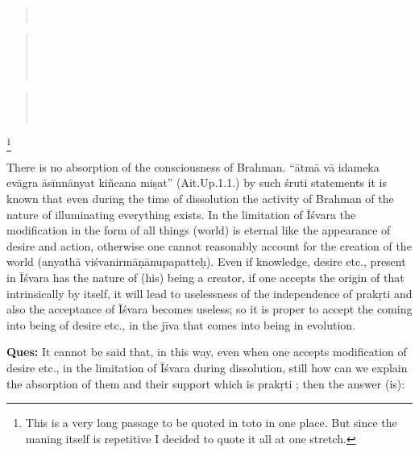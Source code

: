 \begin{verse}
\\
\end{verse}
\begin{verse}
\\
\\
\\
\end{verse}
\begin{verse}
\\
\\
\end{verse}
\footnote{This is a very long passage to be quoted in toto in one place. But since the maning itself is repetitive I decided to quote it all at one stretch.}

There is no absorption of the consciousness of Brahman. “ātmā vā idameka evāgra āsīnnānyat kiñcana miṣat” (Ait.Up.1.1.) by such śruti statements it is known that even during the time of dissolution the activity of Brahman of the nature of illuminating everything exists. In the limitation of Īśvara the modification in the form of all things (world) is eternal like the appearance of desire and action, otherwise one cannot reasonably account for the creation of the world (anyathā viśvanirmāṇānupapatteḥ). Even if knowledge, desire etc., present in Īśvara has the nature of (his) being a creator, if one accepts the origin of that intrinsically by itself, it will lead to uselessness of the independence of prakṛti and also the acceptance of Īśvara becomes useless; so it is proper to accept the coming into being of desire etc., in the jīva that comes into being in evolution.

\textbf{Ques:} It cannot be said that, in this way, even when one accepts modification of desire etc., in the limitation of Īśvara during dissolution, still how can we explain the absorption of them and their support which is prakṛti ; then the answer  (is): 

